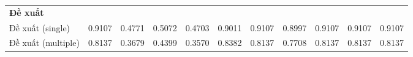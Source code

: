 \begin{table}[H]
{\begin{tabular}{lcccccccccc}
        \hline
        \multicolumn{11}{l}{\textbf{Đề xuất}} \\
        Đề xuất (single) & \cellcolor{green!60!black}0.9107 & \cellcolor{green!60!black}0.4771 & \cellcolor{green!60!black}0.5072 & \cellcolor{green!60!black}0.4703 & \cellcolor{green!60!black}0.9011 & \cellcolor{green!60!black}0.9107 & \cellcolor{green!60!black}0.8997 & \cellcolor{green!60!black}0.9107 & \cellcolor{green!60!black}0.9107 & \cellcolor{green!60!black}0.9107 \\
        Đề xuất (multiple) & \cellcolor{green!30}0.8137 & \cellcolor{green!90!black}0.3679 & \cellcolor{green!90!black}0.4399 & \cellcolor{green!90!black}0.3570 & \cellcolor{green!30}0.8382 & \cellcolor{green!30}0.8137 & \cellcolor{green!30}0.7708 & \cellcolor{green!30}0.8137 & \cellcolor{green!30}0.8137 & \cellcolor{green!30}0.8137 \\
        \hline
    \end{tabular}}
\end{table}

